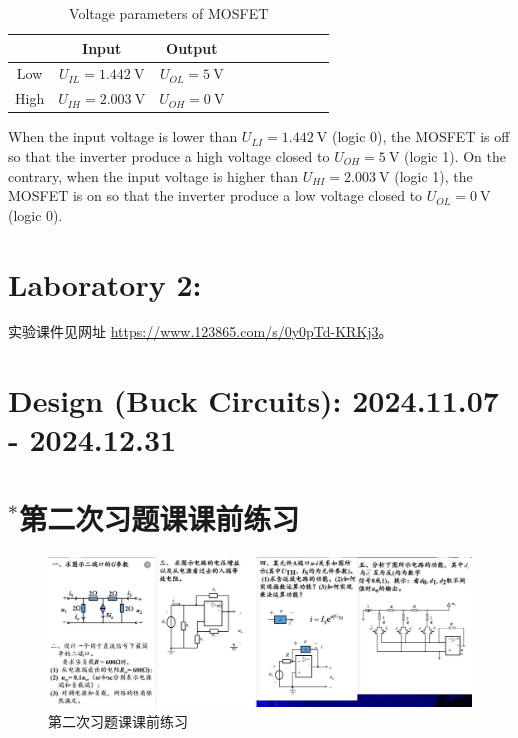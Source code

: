 \documentclass[UTF8]{report}
\theoremstyle{MyLineTheoremStyle} %
\theoremstyle{MyBlockTheoremStyle} %
\theoremstyle{MySubsubsectionStyle} %
\begin{document}
\begin{table}[H]\centering
    \caption{Voltage parameters of MOSFET}
    \label{Voltage parameters of MOSFET}
\begin{tabular}{cccccccccc}\toprule
        & Input  & Output &  \\
    \midrule
    Low & $U_{IL} = 1.442 \ \mathrm{V}$  & $U_{OL} = 5 \ \mathrm{V}$  \\
    High & $U_{IH} = 2.003 \ \mathrm{V}$ & $U_{OH} = 0 \ \mathrm{V}$  \\
    \bottomrule
\end{tabular}
\end{table}
When the input voltage is lower than $U_{LI} = 1.442 \ \mathrm{V}$ (logic 0), the MOSFET is off so that the inverter produce a high voltage closed to $U_{OH}=5 \ \mathrm{V}$ (logic 1). On the contrary, when the input voltage is higher than $U_{HI} = 2.003 \ \mathrm{V}$ (logic 1), the MOSFET is on so that the inverter produce a low voltage closed to $U_{OL} = 0 \ \mathrm{V}$ (logic 0).

\chapter{Laboratory 2: }
\thispagestyle{fancy}

实验课件见网址 \href{}{https://www.123865.com/s/0y0pTd-KRKj3}。


\chapter{Design (Buck Circuits): 2024.11.07 - 2024.12.31}\thispagestyle{fancy}






\chapter*{$^*$第二次习题课课前练习}
\thispagestyle{fancy}

\begin{figure}[H]\centering
\includegraphics[width=0.95\columnwidth]{assets/4/16b6858d371dc967c7673595957d383b_720.jpg}
\caption{ 第二次习题课课前练习}\label{第二次习题课课前练习}
\end{figure}
\end{document}
